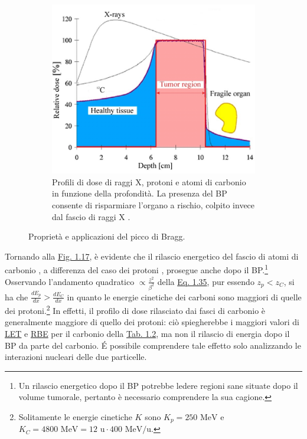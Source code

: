 \documentclass[12pt,a4paper,twoside]{report}
\begin{document}
\begin{figure}[H]
\begin{subfigure}[t]{0.49\textwidth}
			\label{fig:sobp}
		\end{subfigure}
		\par
		\begin{subfigure}[t]{0.49\textwidth}
			\centering
			\includegraphics[width=\textwidth, scale=0.50]{critical_organ.jpg}
			\caption{Profili di dose di raggi X, protoni e atomi di carbonio in funzione della profondità. La presenza del BP consente di risparmiare l'organo a rischio, colpito invece dal fascio di raggi X \cite{unipv_conference2}.}
			\label{fig:critical_organ}
		\end{subfigure}
		\caption{Proprietà e applicazioni del picco di Bragg.}
	\end{figure}
	Tornando alla \hyperref[fig:photon]{Fig. 1.17}, è evidente che il rilascio energetico del fascio di atomi di carbonio , a differenza del caso dei protoni , prosegue anche dopo il BP.\footnote{Un rilascio energetico dopo il BP potrebbe ledere regioni sane situate dopo il volume tumorale, pertanto è necessario comprendere la sua cagione.} Osservando l'andamento quadratico $\propto\frac{z^2}{\beta^2}$ della \hyperref[eq:bethe_bloch]{Eq. 1.35}, pur essendo $z_p<z_C$, si ha che $\frac{dE_p}{dx}>\frac{dE_C}{dx}$ in quanto le energie cinetiche dei carboni sono maggiori di quelle dei protoni.\footnote{Solitamente le energie cinetiche $K$ sono $K_p=250 \mbox{ MeV}$ e $K_C=4800\mbox{ MeV}=12\mbox{ u}\cdot400\mbox{ MeV/u}$.} In effetti, il profilo di dose rilasciato dai fasci di carbonio è generalmente maggiore di quello dei protoni: ciò spiegherebbe i maggiori valori di \hyperref[par:let]{LET} e \hyperref[par:rbe]{RBE} per il carbonio della \hyperref[tab:let_rbe]{Tab. 1.2}, ma non il rilascio di energia dopo il BP da parte del carbonio. \'E possibile comprendere tale effetto solo analizzando le interazioni nucleari delle due particelle.
	
\end{document}
